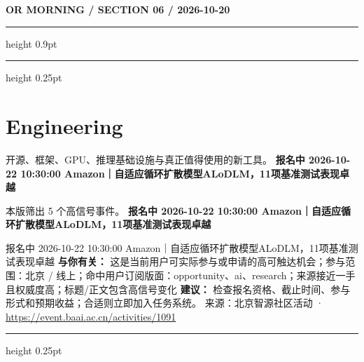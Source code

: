\documentclass[10.5pt]{ctexart}
\begin{document}
\newpage
{\small\bfseries OR MORNING / SECTION 06 / 2026-10-20}
\vspace{2mm}
\hrule height 0.9pt
\vspace{1.5mm}
\hrule height 0.25pt
\vspace{4mm}
\section*{Engineering}
{\color{ormuted} 开源、框架、GPU、推理基础设施与真正值得使用的新工具。}
\vspace{2mm}
{\LARGE\bfseries 报名中 2026-10-22 10:30:00 Amazon｜自适应循环扩散模型ALoDLM，11项基准测试表现卓越}\par
\vspace{1mm}
{\color{ormuted} 本版筛出 5 个高信号事件。}
\vspace{3mm}
{\Large\bfseries 报名中 2026-10-22 10:30:00 Amazon｜自适应循环扩散模型ALoDLM，11项基准测试表现卓越}\par
报名中 2026-10-22 10:30:00 Amazon｜自适应循环扩散模型ALoDLM，11项基准测试表现卓越
\textbf{与你有关：} 这是当前用户可实际参与或申请的高可触达机会；参与范围：北京 / 线上；命中用户订阅版面：opportunity、ai、research；来源接近一手且权威度高；标题/正文包含高信号变化
\textbf{建议：} 检查报名资格、截止时间、参与形式和预期收益；合适则立即加入任务系统。
{\footnotesize\color{ormuted} 来源：北京智源社区活动 · \url{https://event.baai.ac.cn/activities/1091}}
\vspace{4mm}
\hrule height 0.25pt
\vspace{3mm}
\end{document}
